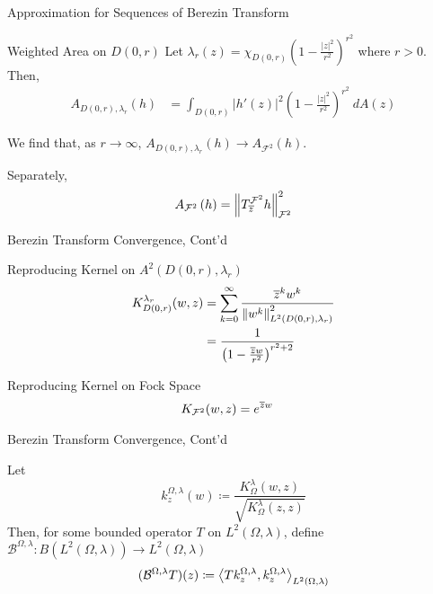 \documentclass{reu_beamer}
\begin{document}
\begin{frame}{Approximation for Sequences of Berezin Transform}
    \begin{block}{Weighted Area on $D(0,r)$}
        Let $\lambda_r(z) = \chi_{D(0, r)}\left(1 - \frac{|z|^2}{r^2}\right)^{r^2}$ where \(r > 0\). Then,
        \begin{align*}
            A_{D(0, r),\lambda_r}(h) &= \int_{D(0,r)}\left\vert h'(z)\right\vert^2\left(1 - \frac{|z|^2}{r^2}\right)^{r^2}\: d A(z)
        \end{align*}
    \end{block}
    We find that, as $r\rightarrow\infty$, $A_{D(0, r),\lambda_r}(h) \rightarrow A_{\mathcal{F}^2}(h)$.\newline %
    
    Separately,
   \begin{align*}
      A_{\mathcal{F}^2}\left(h\right)&=\left\Vert T^{\mathcal{F}^2}_{\overline{z}}h \right\Vert^2_{\mathcal{F}^2}\\
   \end{align*}
\end{frame}
\begin{frame}{Berezin Transform Convergence, Cont'd}
    \begin{block}{Reproducing Kernel on $A^{2}\left(D(0,r),\lambda_r\right)$}
        \begin{align*}
          K_{D(0,r)}^{\lambda_r}(w, z) &= \sum_{k=0}^{\infty}\frac{\overline{z}^k w^{k}}{\left\Vert w^k \right\Vert^2_{L^{2}\left(D(0,r),\lambda_r\right)}}\\
            &= \frac{1}{\left(1 - \frac{\overline{z}w}{r^2}\right)^{r^2 + 2}}
        \end{align*}
    \end{block}
    \begin{block}{Reproducing Kernel on Fock Space}
        \begin{align*}
            K_{\mathcal{F}^2}(w,z) &= e^{\overline{z}w}
        \end{align*}
    \end{block}
\end{frame}
\begin{frame}{Berezin Transform Convergence, Cont'd}
    \begin{definition}
        Let
        \[k^{\Omega, \lambda}_z(w) \coloneq \frac{K_\Omega^ \lambda(w, z)}{\sqrt{K_\Omega^ \lambda(z, z)}}\]
        Then, for some bounded operator $T$ on \(L^2(\Omega, \lambda)\), define \(\mathcal{B}^{\Omega, \lambda} : B(L^2(\Omega, \lambda)) \to L^2(\Omega, \lambda)\)
        \[(\mathcal{B}^{\Omega, \lambda}T)(z) \coloneq \left\langle T k^{\Omega, \lambda}_z, k^{\Omega, \lambda}_z\right\rangle_{L^2(\Omega, \lambda)}\]
    \end{definition}
\end{frame}
\end{document}
